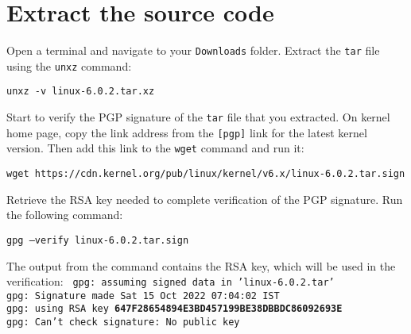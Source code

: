 \documentclass[12pt,a4paper]{report}
\begin{document}
\section{Extract the source code}
Open a terminal and navigate to your \texttt{Downloads} folder. Extract the \texttt{tar} file using the \texttt{unxz} command:
\newline
\newline
\centerline{\texttt{unxz -v linux-6.0.2.tar.xz}}
\newline
\newline 
Start to verify the PGP signature of the \texttt{tar} file that you extracted. On kernel home page, copy the link address from the \texttt{[pgp]} link for the latest kernel version. Then add this link to the \texttt{wget} command and run it:
\newline
\newline
\centerline{\texttt{\footnotesize wget https://cdn.kernel.org/pub/linux/kernel/v6.x/linux-6.0.2.tar.sign}}
\newline
\newline 
Retrieve the RSA key needed to complete verification of the PGP signature. Run the following command:
\newline
\newline
\centerline{\texttt{gpg --verify linux-6.0.2.tar.sign}}
\newline
\newline 
The output from the command contains the RSA key, which will be used in the verification:
\newline
\newline
\texttt{
gpg: assuming signed data in 'linux-6.0.2.tar'
\\
gpg: Signature made Sat 15 Oct 2022 07:04:02 IST
\\
gpg:                using RSA key \textbf{647F28654894E3BD457199BE38DBBDC86092693E}
\\
gpg: Can't check signature: No public key
}
\newline
\end{document}
